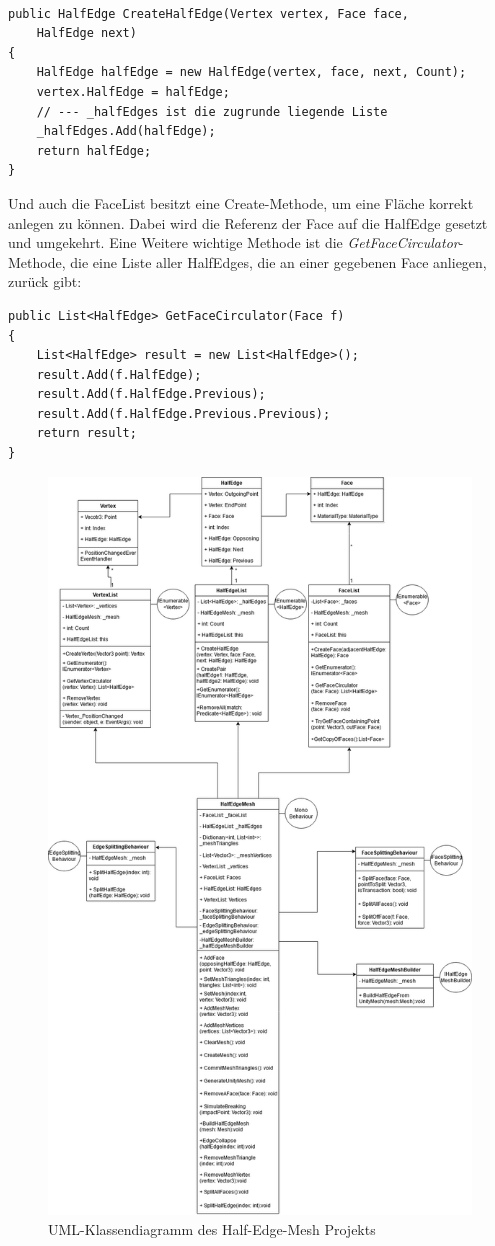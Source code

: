 \begin{lstlisting}

public HalfEdge CreateHalfEdge(Vertex vertex, Face face, 
	HalfEdge next)
{
	HalfEdge halfEdge = new HalfEdge(vertex, face, next, Count);
	vertex.HalfEdge = halfEdge;
	// --- _halfEdges ist die zugrunde liegende Liste
	_halfEdges.Add(halfEdge);
	return halfEdge;
}

\end{lstlisting}

Und auch die FaceList besitzt eine Create-Methode, um eine Fl\"ache korrekt anlegen zu k\"onnen. Dabei wird die Referenz der Face auf die HalfEdge gesetzt und umgekehrt. Eine Weitere wichtige Methode ist die \textit{GetFaceCirculator}-Methode, die eine Liste aller HalfEdges, die an einer gegebenen Face anliegen, zur\"uck gibt:

\begin{lstlisting}
public List<HalfEdge> GetFaceCirculator(Face f)
{
	List<HalfEdge> result = new List<HalfEdge>();
	result.Add(f.HalfEdge);
	result.Add(f.HalfEdge.Previous);
	result.Add(f.HalfEdge.Previous.Previous);
	return result;
}
\end{lstlisting}

\begin{figure}[t]
	\centering
	\includegraphics[width=0.7\linewidth]{Images/ClassDiagramHalfEdgeMesh}
	\caption[HalfEdgeMeshUMLDiagramm]{UML-Klassendiagramm des Half-Edge-Mesh Projekts}
	\label{fig:classdiagramhalfedgemesh}
\end{figure}


